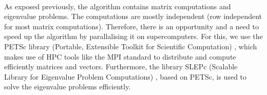 \paragraph{}
As exposed previously, the algorithm contains matrix computations and eigenvalue problems.
The computations are mostly independent (row independent for most matrix computations).
Therefore, there is an opportunity and a need to speed up the algorithm by parallalising it on supercomputers.
For this, we use the PETSc library (Portable, Extensible Toolkit for Scientific Computation) \cite{petsc_web_page}, which makes use of HPC tools like the MPI standard to distribute and compute efficiently matrices and vectors.
Furthermore, the library SLEPc (Scalable Library for Eigenvalue Problem Computations) \cite{hernandez_2005_slepc}, based on PETSc, is used to solve the eigenvalue problems efficiently.
